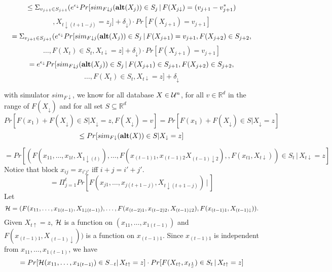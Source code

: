 \documentclass[11pt]{article}
\begin{document}
\[
\leq \Sigma_{v_{j+1} \in S_{j+1}} (e^{\epsilon_\downarrow} Pr[ sim_{F\downarrow j} ({\bf alt} (X_{j})) \in S_{j} \,|\, F(X_{j\downarrow}) =(v_{j+1} - v_{j+1}^{*})
\]
\[
,  X_{t\downarrow (t+1-j)}=z_{j}] + \delta_{\downarrow}) \cdot Pr[F(X_{j+1})=v_{j+1}]
\]
\[
=\Sigma_{v_{j+1} \in S_{j+1}} (e^{\epsilon_\downarrow} Pr[ sim_{F\downarrow j} ({\bf alt} (X_{j})) \in S_{j} \,|\,   F(X_{j+1})=v_{j+1} , F(X_{j+2})\in S_{j+2}, 
\]
\[
\dots, F(X_{t}) \in S_{t},X_{t\downarrow}=z]+\delta_{\downarrow}) \cdot Pr[F(X_{j+1})=v_{j+1}]
\]
\[
=e^{\epsilon_\downarrow} Pr[ sim_{F\downarrow j} ({\bf alt} (X_{j})) \in S_{j} \,|\,   F(X_{j+1}) \in S_{j+1} , F(X_{j+2})\in S_{j+2}, 
\]
\[
\dots, F(X_{t}) \in S_{t},X_{t\downarrow}=z]+\delta_{\downarrow}
\]

 with simulator $sim_{F\downarrow}$, we know for all database $X \in {\cal U}^{n}$, for all $v \in \mathbb{R}^{d}$ in the range of $F(X_{\downarrow})$ and for all set $S \subseteq \mathbb{R}^{d}$
\[
Pr[F(x_{1})+F(X_{\downarrow}) \in S | X_{\downarrow} =z, F(X_{\downarrow}) =v] =Pr[F(x_{1})+F(X_{\downarrow}) \in S | X_{\downarrow} =z] 
\]
\[
\leq Pr[sim_{F\downarrow} ({\bf alt}(X)) \in S | X_{\downarrow} =z]
\]





\[
=Pr[ (F(x_{11},\dots, x_{1t}, X_{1 \downarrow (t)}),  \dots, F(x_{(t-1)1}, x_{(t-1)2} X_{(t-1)\downarrow2}),, F(x_{t1}, X_{t \downarrow})) \in S_{t}\,|\, X_{t\downarrow} =z]
\]
Notice that block $x_{ij} = x_{i'j'}$ iff $i+j=i'+j'$. 
\[
= \Pi_{j=1}^{t} Pr[F(x_{j1}, \dots , x_{j(t+1-j)}, X_{t\downarrow (t+1-j)}) \,|\, ]
\]
Let $${\cal H}=(F(x_{11},\dots,  x_{1(t-1)}, X_{1 \downarrow (t-1)}),   \dots,F(x_{(t-2)1}, x_{(t-2)2}, X_{(t-1)\downarrow 2}), F(x_{(t-1)1}, X_{(t-1)\downarrow})).$$ Given $X_{t\uparrow} =z$, $\cal H$ is a function on $(x_{11},\dots, x_{1(t-1)})$ and $F(x_{(t-1)1}, X_{(t-1)\downarrow}))$ is a function on $x_{(t-1)1}$. Since $x_{(t-1)1}$ is independent from $x_{11},\dots, x_{1(t-1)}$, we have
\[
=Pr[ {\cal H} (x_{11},\dots, x_{1(t-1)}) \in S_{-t} |\, X_{t\uparrow} =z] \cdot Pr [F(X_{t\uparrow}, x_{t \frac{1}{c}}) \in S_{t}\,|\, X_{t\uparrow} =z ] 
\]
\end{document}
